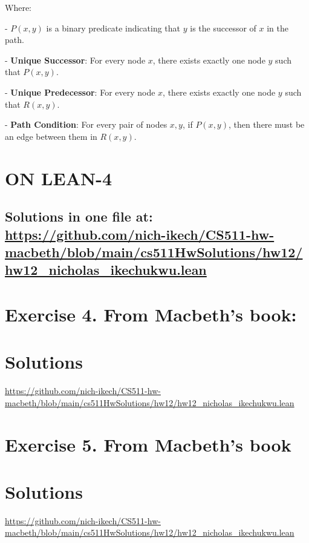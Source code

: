 \documentclass{article}
\begin{document}
    \vspace{1em}
 Where:
 
    \vspace{1em}
- \( P(x, y) \) is a binary predicate indicating that \( y \) is the successor of \( x \) in the path. 

    \vspace{1em}
- \textbf{Unique Successor}: For every node \( x \), there exists exactly one node \( y \) such that \( P(x, y) \).

    \vspace{1em}
 - \textbf{Unique Predecessor}: For every node \( x \), there exists exactly one node \( y \) such that \( R(x,y)\).
 
 \vspace{1em}
 - \textbf{Path Condition}: For every pair of nodes \( x, y \), if \( P(x, y) \), then there must be an edge between them in \( R(x, y) \).
 \vspace{1em}

\newpage



\section*{ON LEAN-4}
\subsection*{Solutions in one file at: 
\url{https://github.com/nich-ikech/CS511-hw-macbeth/blob/main/cs511HwSolutions/hw12/hw12_nicholas_ikechukwu.lean}}
 
\newpage

\section*{Exercise 4. From Macbeth’s book:}
\section*{Solutions}
\url{https://github.com/nich-ikech/CS511-hw-macbeth/blob/main/cs511HwSolutions/hw12/hw12_nicholas_ikechukwu.lean}

\newpage

\section*{Exercise 5. From Macbeth's book}
\section*{Solutions}
\url{https://github.com/nich-ikech/CS511-hw-macbeth/blob/main/cs511HwSolutions/hw12/hw12_nicholas_ikechukwu.lean}
\end{document}
